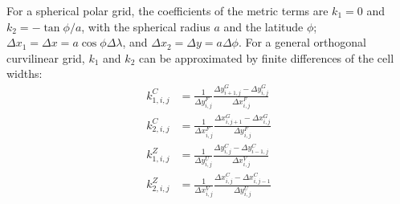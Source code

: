 For a spherical polar grid, the coefficients of the metric terms are
$k_{1}=0$ and $k_{2}=-\tan\phi/a$, with the spherical radius $a$ and
the latitude $\phi$; $\Delta{x}_1 = \Delta{x} = a\cos\phi
\Delta\lambda$, and $\Delta{x}_2 = \Delta{y}=a\Delta\phi$. For a
general orthogonal curvilinear grid, $k_{1}$ and
$k_{2}$ can be approximated by finite differences of the cell widths:
\begin{align}
  k_{1,i,j}^{C} &= \frac{1}{\Delta{y}_{i,j}^{F}}
  \frac{\Delta{y}_{i+1,j}^{G}-\Delta{y}_{i,j}^{G}}{\Delta{x}_{i,j}^{F}} \\
  k_{2,i,j}^{C} &= \frac{1}{\Delta{x}_{i,j}^{F}}
  \frac{\Delta{x}_{i,j+1}^{G}-\Delta{x}_{i,j}^{G}}{\Delta{y}_{i,j}^{F}} \\
  k_{1,i,j}^{Z} &= \frac{1}{\Delta{y}_{i,j}^{U}}
  \frac{\Delta{y}_{i,j}^{C}-\Delta{y}_{i-1,j}^{C}}{\Delta{x}_{i,j}^{V}} \\
  k_{2,i,j}^{Z} &= \frac{1}{\Delta{x}_{i,j}^{V}}
  \frac{\Delta{x}_{i,j}^{C}-\Delta{x}_{i,j-1}^{C}}{\Delta{y}_{i,j}^{U}}
\end{align}

